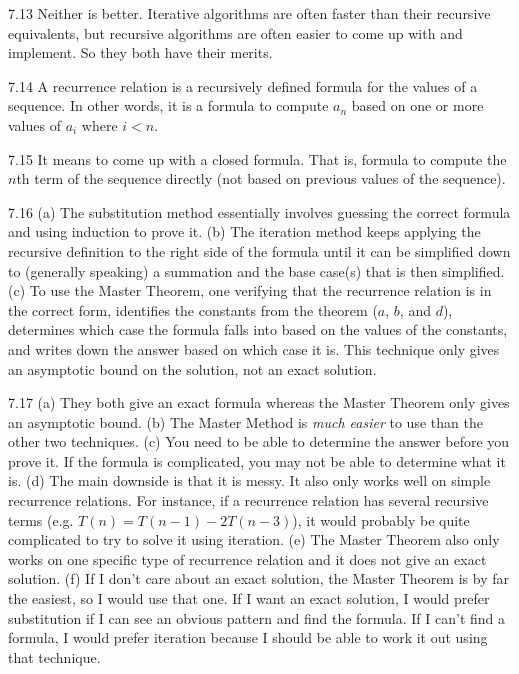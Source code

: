 \begin{RequAnswer}{7.13}
Neither is better. Iterative algorithms are often faster than their recursive equivalents,
but recursive algorithms are often easier to come up with and implement.
So they both have their merits.
\end{RequAnswer}
\begin{RequAnswer}{7.14}
A recurrence relation is a recursively defined formula for the values of a sequence.
In other words, it is a formula to compute $a_n$ based on one or more values of $a_i$
where $i<n$.
\end{RequAnswer}
\begin{RequAnswer}{7.15}
It means to come up with a closed formula. That is, formula to compute the $n$th term of the
sequence directly (not based on previous values of the sequence).
\end{RequAnswer}
\begin{RequAnswer}{7.16}
(a) The substitution method essentially involves guessing the correct formula and using induction to prove it.
(b) The iteration method keeps applying the recursive definition to the right side of the formula until it can
be simplified down to (generally speaking) a summation and the base case(s) that is then simplified.
(c) To use the Master Theorem, one verifying that the recurrence relation is in the correct form,
identifies the constants from the theorem ($a$, $b$, and $d$),
determines which case the formula falls into based on the values of the constants,
and writes down the answer based on which case it is.
This technique only gives an asymptotic bound on the solution, not an exact solution.
\end{RequAnswer}
\begin{RequAnswer}{7.17}
(a) They both give an exact formula whereas the Master Theorem only gives an asymptotic bound.
(b) The Master Method is {\em much easier} to use than the other two techniques.
(c) You need to be able to determine the answer before you prove it. If the formula is complicated,
you may not be able to determine what it is.
(d) The main downside is that it is messy. It also only works well on simple recurrence relations. For instance,
if a recurrence relation has several recursive terms (e.g. $T(n)=T(n-1)-2T(n-3)$), it would probably be
quite complicated to try to solve it using iteration.
(e) The Master Theorem also only works on one specific type of recurrence relation
and it does not give an exact solution.
(f) If I don't care about an exact solution, the Master Theorem is by far the easiest, so I would use that one.
If I want an exact solution, I would prefer substitution if I can see an obvious pattern and find the formula.
If I can't find a formula, I would prefer iteration because I should be able to work it out using that technique.
\end{RequAnswer}
